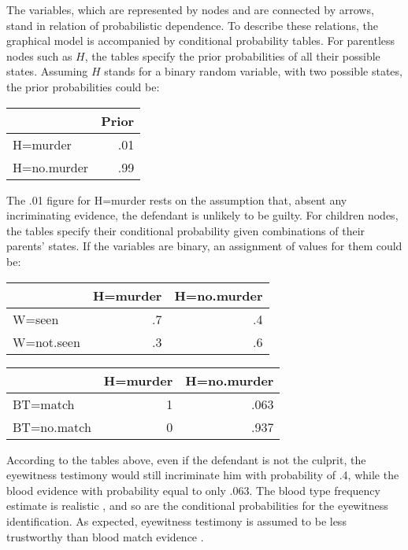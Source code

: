 \documentclass{article}
\begin{document}
The variables, which are represented by nodes and are connected by arrows, stand in relation of probabilistic dependence. To describe these relations, 
the graphical model is accompanied by conditional probability tables. %
For parentless nodes such as $H$, the tables specify 
the prior probabilities of all their possible states. Assuming $H$ stands for a binary random variable, with two possible states, 
the prior probabilities 
could be:
%
\begin{table}[H]
\centering
\begin{tabular}{lr}
\toprule
  & Prior\\
\midrule
H=murder & .01\\
H=no.murder & .99\\
\bottomrule
\end{tabular}
\end{table}
% 
\noindent
The .01 figure for H=murder rests on the assumption that, absent any incriminating evidence, the defendant is unlikely to be guilty. For children nodes, the tables specify their conditional probability given combinations of their parents' states.  If the variables are  binary, an assignment of values for them could be:
%
\begin{table}[H]
\centering
\begin{tabular}{lrr}
\toprule
  & H=murder & H=no.murder\\
\midrule
W=seen & .7 & .4\\
W=not.seen & .3 & .6\\
\bottomrule
\end{tabular}
\end{table}

\begin{table}[H]
\centering
\begin{tabular}{lrr}
\toprule
  & H=murder & H=no.murder\\
\midrule
BT=match & 1 & .063\\
BT=no.match & 0 & .937\\
\bottomrule
\end{tabular}
\end{table}
%
\noindent
According to the tables above, even if the defendant is not the culprit, the eyewitness testimony would still incriminate him with  probability of .4, while the blood evidence with  probability equal to only .063. The blood type frequency estimate is realistic \citep[141]{lucy2013introduction}, and so are the conditional probabilities for the eyewitness identification. 
As expected, eyewitness testimony is assumed to be less trustworthy than blood match evidence  \citep[but for complications about assessing eyewitness testimony, see][]{wixted2017RelationshipEyewitnessConfidence, Urbaniak2020Decision}.
\end{document}
